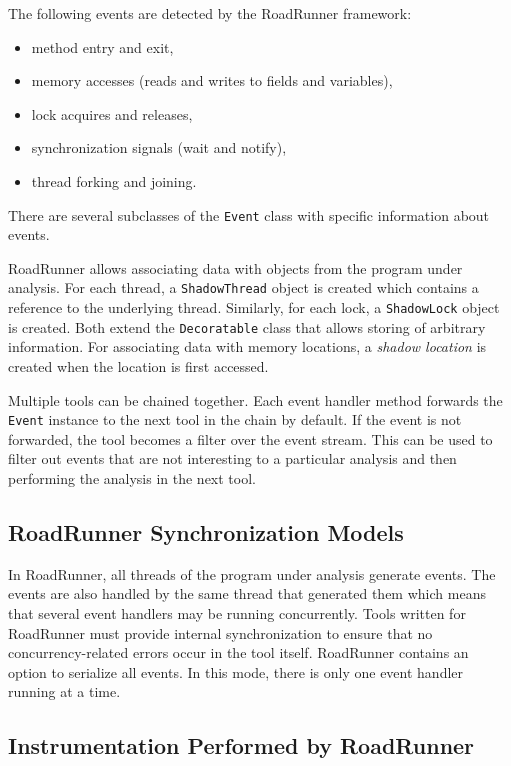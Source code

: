 The following events are detected by the RoadRunner framework:
\begin{itemize}
    \item method entry and exit,
    \item memory accesses (reads and writes to fields and variables),
    \item lock acquires and releases,
    \item synchronization signals (wait and notify),
    \item thread forking and joining.
\end{itemize}

There are several subclasses of the \texttt{Event} class with specific
information about events.

RoadRunner allows associating data with objects from the program under analysis.
For each thread, a \texttt{ShadowThread} object is created which contains a
reference to the underlying thread. Similarly, for each lock, a
\texttt{ShadowLock} object is created. Both extend the \texttt{Decoratable}
class that allows storing of arbitrary information. For associating data with
memory locations, a \emph{shadow location} is created when the location is first
accessed.

Multiple tools can be chained together. Each event handler method forwards the
\texttt{Event} instance to the next tool in the chain by default. If the event
is not forwarded, the tool becomes a filter over the event stream. This can be
used to filter out events that are not interesting to a particular analysis and
then performing the analysis in the next tool.

\subsection{RoadRunner Synchronization Models}

In RoadRunner, all threads of the program under analysis generate events. The
events are also handled by the same thread that generated them which means that
several event handlers may be running concurrently. Tools written for RoadRunner
must provide internal synchronization to ensure that no concurrency-related
errors occur in the tool itself. RoadRunner contains an option to serialize all
events. In this mode, there is only one event handler running at a time.

\subsection{Instrumentation Performed by RoadRunner}

